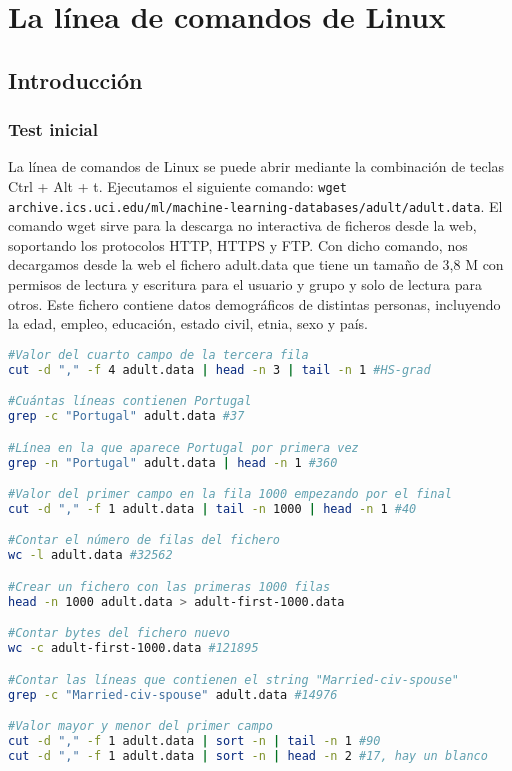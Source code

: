 \chapter{La línea de comandos de Linux}
\section{Introducción}
\subsection{Test inicial}
La línea de comandos de Linux se puede abrir mediante la combinación de teclas Ctrl + Alt + t. Ejecutamos el siguiente comando: \texttt{wget archive.ics.uci.edu/ml/machine-learning-databases/adult/adult.data}. El comando wget sirve para la descarga no interactiva de ficheros desde la web, soportando los protocolos HTTP, HTTPS y FTP. Con dicho comando, nos decargamos desde la web el fichero adult.data que tiene un tamaño de 3,8 M con permisos de lectura y escritura para el usuario y grupo y solo de lectura para otros. Este fichero contiene datos demográficos de distintas personas, incluyendo la edad, empleo, educación, estado civil, etnia, sexo y país.
\begin{lstlisting}[language=bash]
#Valor del cuarto campo de la tercera fila
cut -d "," -f 4 adult.data | head -n 3 | tail -n 1 #HS-grad

#Cuántas líneas contienen Portugal
grep -c "Portugal" adult.data #37

#Línea en la que aparece Portugal por primera vez
grep -n "Portugal" adult.data | head -n 1 #360

#Valor del primer campo en la fila 1000 empezando por el final
cut -d "," -f 1 adult.data | tail -n 1000 | head -n 1 #40

#Contar el número de filas del fichero
wc -l adult.data #32562

#Crear un fichero con las primeras 1000 filas 
head -n 1000 adult.data > adult-first-1000.data

#Contar bytes del fichero nuevo
wc -c adult-first-1000.data #121895

#Contar las líneas que contienen el string "Married-civ-spouse"
grep -c "Married-civ-spouse" adult.data #14976

#Valor mayor y menor del primer campo
cut -d "," -f 1 adult.data | sort -n | tail -n 1 #90 
cut -d "," -f 1 adult.data | sort -n | head -n 2 #17, hay un blanco
\end{lstlisting}

